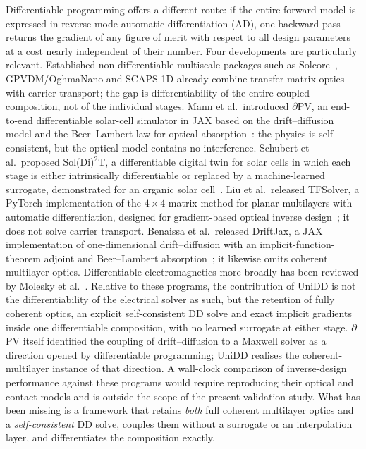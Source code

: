 \documentclass[preprint,12pt]{elsarticle}
\begin{document}
Differentiable programming offers a different route: if the entire forward
model is expressed in reverse-mode automatic differentiation (AD), one
backward pass returns the gradient of any figure of merit with respect to all
design parameters at a cost nearly independent of their number. Four
developments are particularly relevant. Established non-differentiable
multiscale packages such as Solcore~\cite{solcore2018}, GPVDM/OghmaNano
and SCAPS-1D already combine transfer-matrix optics with carrier
transport; the gap is differentiability of the entire coupled
composition, not of the individual stages. Mann et al.\ introduced
$\partial$PV, an end-to-end differentiable solar-cell simulator in JAX based
on the drift--diffusion model and the Beer--Lambert law for optical
absorption~\cite{mann2022}: the physics is self-consistent, but the optical
model contains no interference. Schubert et al.\ proposed Sol(Di)$^2$T, a
differentiable digital twin for solar cells in which each stage is either
intrinsically differentiable or replaced by a machine-learned surrogate,
demonstrated for an organic solar cell~\cite{schubert2025}. Liu et al.\
released TFSolver, a PyTorch implementation of the $4\times4$ matrix method
for planar multilayers with automatic differentiation, designed for
gradient-based optical inverse design~\cite{liu2025}; it does not solve
carrier transport. Benaissa et al.\ released DriftJax, a JAX implementation of one-dimensional drift--diffusion with an implicit-function-theorem adjoint and Beer--Lambert absorption~\cite{driftjax2026}; it likewise omits coherent multilayer optics. Differentiable electromagnetics more broadly has been
reviewed by Molesky et al.~\cite{molesky2018}. Relative to these programs, the contribution of UniDD is not the differentiability of the electrical solver as such, but the retention of fully coherent optics, an explicit self-consistent DD solve and exact implicit gradients inside one differentiable composition, with no learned surrogate at either stage. $\partial$PV itself identified the coupling of drift--diffusion to a Maxwell solver as a direction opened by differentiable programming; UniDD realises the coherent-multilayer instance of that direction. A wall-clock comparison of inverse-design performance against these programs would require reproducing their optical and contact models and is outside the scope of the present validation study. What has been missing is a
framework that retains \emph{both} full coherent multilayer optics and a
\emph{self-consistent} DD solve, couples them without a surrogate or an
interpolation layer, and differentiates the composition exactly.
\end{document}
